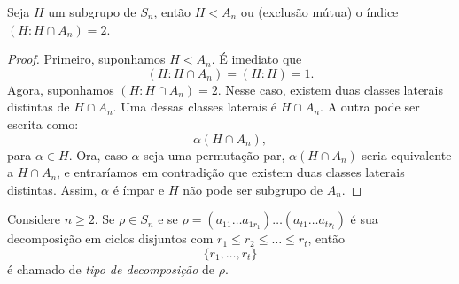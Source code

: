 \documentclass[11pt,openany]{book}
\newenvironment{novo}{
    \color{red}
}{}
\begin{document}
\begin{novo}
\begin{proposition}
\label{prop:permutacoes_subgrupo_OU_indice2}
    Seja $H$ um subgrupo de $S_n$, então $H < A_n$ ou (exclusão mútua) o índice $(H:H \cap A_n) = 2$.
\end{proposition}
\begin{proof}
    Primeiro, suponhamos $H < A_n$. É imediato que
    \[(H:H \cap A_n) = (H:H) = 1.\]
    Agora, suponhamos $(H:H \cap A_n) = 2$. Nesse caso, existem duas classes laterais distintas de $H \cap A_n$. Uma dessas classes laterais é $H \cap A_n$. A outra pode ser escrita como:
    \[\alpha (H \cap A_n),\]
    para $\alpha \in H$.
    Ora, caso $\alpha$ seja uma permutação par, $\alpha (H \cap A_n)$ seria equivalente a $H \cap A_n$, e entraríamos em contradição que existem duas classes laterais distintas. Assim, $\alpha$ é ímpar e $H$ não pode ser subgrupo de $A_n$.
\end{proof}
\end{novo}

\begin{novo}
\begin{definition}
\label{def:tipo_de_decomposicao}
    Considere $n \geq 2$. Se $\rho \in S_n$ e se $\rho = (a_{11} \dots a_{1r_1})\dots(a_{t1} \dots a_{tr_t})$ é sua decomposição em ciclos disjuntos com $r_1 \leq r_2 \leq \dots \leq r_t$, então 
    \[\{r_1,\dots,r_t\}\]
    é chamado de \textit{tipo de decomposição} de $\rho$.
\end{definition}
\end{novo}
\end{document}
